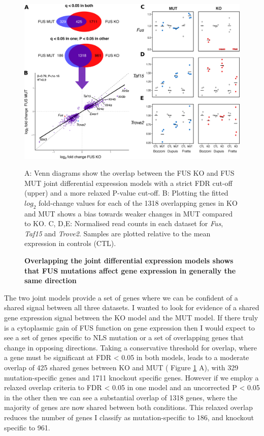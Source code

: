 \begin{figure}[h!]
	\centering
	\includegraphics[width=\textwidth]{Figures/06_fus_meta/expression_multi.png}
	\caption{\textbf{Overlapping the joint differential expression models shows that FUS mutations affect gene expression in generally the same direction}}
	A: Venn diagrams show the overlap between the FUS KO and FUS MUT joint differential expression models with a strict FDR cut-off (upper) and a more relaxed P-value cut-off. 
	B: Plotting the fitted $log_2$ fold-change values for each of the 1318 overlapping genes in KO and MUT shows a bias towards weaker changes in MUT compared to KO.
	C, D,E: Normalised read counts in each dataset for \textit{Fus}, \textit{Taf15} and \textit{Trove2}. Samples are plotted relative to the mean expression in controls (CTL).
	\label{fig:fus_expression_multipanel}
\end{figure}

The two joint models provide a set of genes where we can be confident of a shared signal between all three datasets.  
I wanted to look for evidence of a shared gene expression signal between the KO model and the MUT model.
If there truly is a cytoplasmic gain of FUS function on gene expression then I would expect to see a set of genes specific to NLS mutation or a set of overlapping genes that change in opposing directions.
Taking a conservative threshold for overlap, where a gene must be significant at FDR < 0.05 in both models, leads to a moderate overlap of 425 shared genes between KO and MUT ( Figure \ref{fig:fus_expression_multipanel} A), with 329 mutation-specific genes and 1711 knockout specific genes.
However if we employ a relaxed overlap criteria to FDR < 0.05 in one model and an uncorrected P < 0.05 in the other then we can see a substantial overlap of 1318 genes, where the majority of genes are now shared between both conditions.
This relaxed overlap reduces the number of genes I classify as mutation-specific to 186, and knockout specific to 961.

